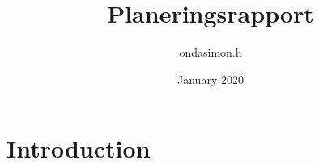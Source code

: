 \documentclass{article}
\title{Planeringsrapport}
\author{ondasimon.h }
\date{January 2020}
\begin{document}
\maketitle

\section{Introduction}
\end{document}
